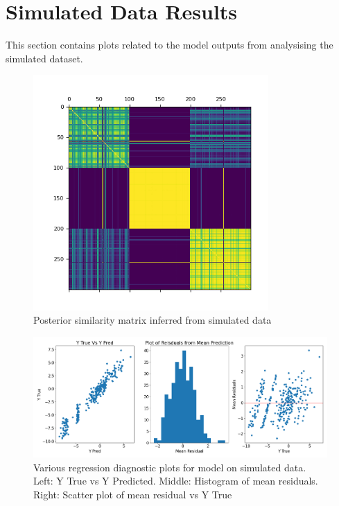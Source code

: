 \documentclass{article}
\begin{document}
\section{Simulated Data Results}
This section contains plots related to the model outputs from analysising the simulated dataset.
\begin{figure}[H]
  \centering
  \includegraphics[width=0.8\textwidth]{Plots/Simulated Posterior Similarity Matrix.png}
  \caption{Posterior similarity matrix inferred from simulated data}
  \label{fig:sim_post_mat}
\end{figure}

\begin{figure}[H]
  \centering
  \includegraphics[width=1\textwidth]{Plots/simuated_diagnostics.png}
  \caption{Various regression diagnostic plots for model on simulated data. Left: Y True vs Y Predicted. Middle: Histogram of mean residuals. Right: Scatter plot of mean residual vs Y True}
  \label{fig:sim_diag_plots}
\end{figure}
\end{document}
